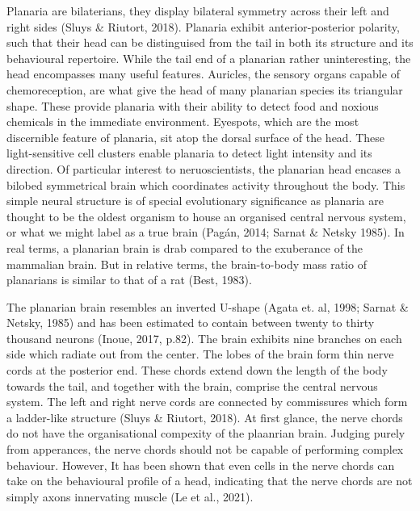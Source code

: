 \documentclass[
  letterpaper,
  DIV=11,
  numbers=noendperiod,
  oneside]{scrartcl}
\begin{document}
Planaria are bilaterians, they display bilateral symmetry across their
left and right sides (Sluys \& Riutort, 2018). Planaria exhibit
anterior-posterior polarity, such that their head can be distinguised
from the tail in both its structure and its behavioural repertoire.
While the tail end of a planarian rather uninteresting, the head
encompasses many useful features. Auricles, the sensory organs capable
of chemoreception, are what give the head of many planarian species its
triangular shape. These provide planaria with their ability to detect
food and noxious chemicals in the immediate environment. Eyespots, which
are the most discernible feature of planaria, sit atop the dorsal
surface of the head. These light-sensitive cell clusters enable planaria
to detect light intensity and its direction. Of particular interest to
neruoscientists, the planarian head encases a bilobed symmetrical brain
which coordinates activity throughout the body. This simple neural
structure is of special evolutionary significance as planaria are
thought to be the oldest organism to house an organised central nervous
system, or what we might label as a true brain (Pagán, 2014; Sarnat \&
Netsky 1985). In real terms, a planarian brain is drab compared to the
exuberance of the mammalian brain. But in relative terms, the
brain-to-body mass ratio of planarians is similar to that of a rat
(Best, 1983).

The planarian brain resembles an inverted U-shape (Agata et. al, 1998;
Sarnat \& Netsky, 1985) and has been estimated to contain between twenty
to thirty thousand neurons (Inoue, 2017, p.82). The brain exhibits nine
branches on each side which radiate out from the center. The lobes of
the brain form thin nerve cords at the posterior end. These chords
extend down the length of the body towards the tail, and together with
the brain, comprise the central nervous system. The left and right nerve
cords are connected by commissures which form a ladder-like structure
(Sluys \& Riutort, 2018). At first glance, the nerve chords do not have
the organisational compexity of the plaanrian brain. Judging purely from
apperances, the nerve chords should not be capable of performing complex
behaviour. However, It has been shown that even cells in the nerve
chords can take on the behavioural profile of a head, indicating that
the nerve chords are not simply axons innervating muscle (Le et al.,
2021).
\end{document}
